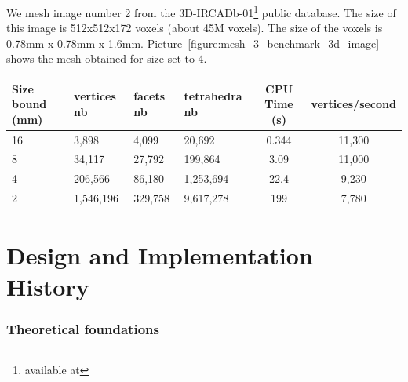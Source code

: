 We mesh image number 2 from the 3D-IRCADb-01\footnote{available at  } public database.
The size of this image is 512x512x172 voxels (about 45M voxels). The size of the voxels
is 0.78mm x 0.78mm x 1.6mm. Picture~\ref{figure:mesh_3_benchmark_3d_image}
shows the mesh obtained for size set to 4.

\begin{center}
\begin{tabular}{|l|l|l|l||c|c|}
  \hline
  Size bound (mm) & vertices nb & facets nb & tetrahedra nb & CPU Time (s) & vertices/second\\
  \hline
  16 & 3,898 & 4,099 & 20,692 & 0.344 & 11,300 \\
  8 & 34,117 & 27,792 & 199,864 & 3.09 & 11,000 \\
  4 & 206,566 & 86,180 & 1,253,694 & 22.4 & 9,230 \\
  2 & 1,546,196 & 329,758 & 9,617,278 & 199 & 7,780 \\
  \hline
\end{tabular}
\end{center}



\section{Design and Implementation History}


\subsubsection{Theoretical  foundations}


